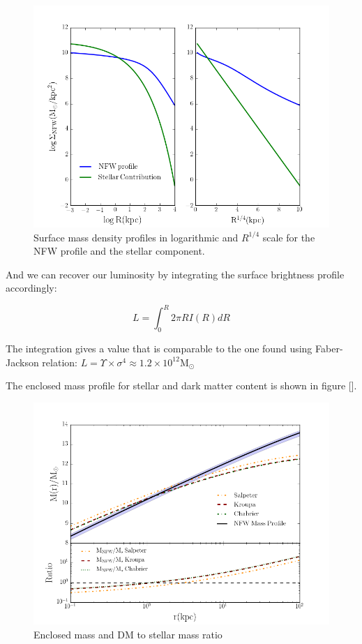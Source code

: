 \begin{figure}[H]
\centering
\includegraphics[width=12cm]{images/Surface_mass_density_log.png}
\caption[Surface mass density profiles]{Surface mass density profiles in logarithmic and $R^{1/4}$ scale for the NFW profile and the stellar component.}
\end{figure}

And we can recover our luminosity by integrating the surface brightness profile accordingly:

\begin{equation}
L=\int_{0}^{R}2\pi RI(R)dR
\end{equation}

The integration gives a value that is comparable to the one found using Faber-Jackson relation: $L=\Upsilon\times\sigma^{4}\approx 1.2\times 10^{12}\text{M}_{\odot}$

The enclosed mass profile for stellar and dark matter content is shown in figure [].

\begin{figure}[H]
\centering
\includegraphics[width=12cm]{images/DM_fraction_all_IMFs.png}
\caption[Enclosed mass and DM to stellar mass ratio]{Enclosed mass and DM to stellar mass ratio}
\end{figure}

